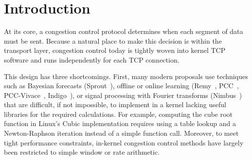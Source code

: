 \section{Introduction}

At its core, a congestion control protocol determines when each segment of data must be sent. Because a natural place to make this decision is within the transport layer, congestion control today is tightly woven into kernel TCP software and runs independently for each TCP connection.

This design has three shortcomings. First, many modern proposals use techniques such as Bayesian forecasts (Sprout~\cite{sprout}), offline or online learning (Remy~\cite{remy}, PCC~\cite{pcc}, PCC-Vivace~\cite{pcc-vivace}, Indigo~\cite{pantheon}), or signal processing with Fourier transforms (Nimbus~\cite{nimbus}) that are difficult, if not impossible, to implement in a kernel lacking useful libraries for the required calculations. For example, computing the cube root function in Linux's Cubic implementation requires using a table lookup and a Newton-Raphson iteration instead of a simple function call. Moreover, to meet tight performance constraints, in-kernel congestion control methods have largely been restricted to simple window or rate arithmetic.



